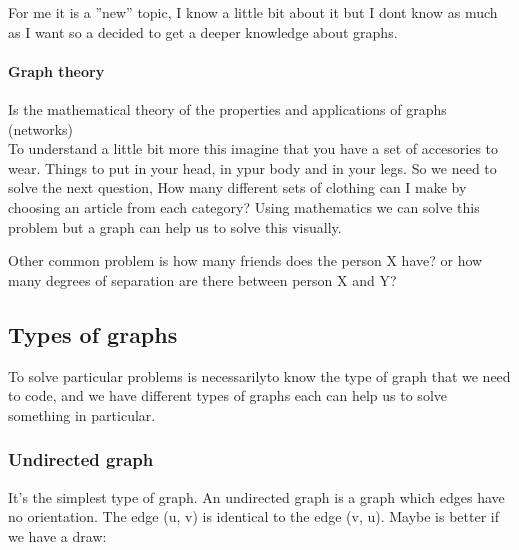 For me it is a ''new'' topic, I know a little bit about it but I dont know as much as I want so a decided to get a deeper knowledge about graphs.

\paragraph{Graph theory}
Is the mathematical theory of the properties and applications of graphs (networks)\\

To understand a little bit more this imagine that you have a set of accesories to wear. Things to put in your head, in ypur body and in your legs. So we need to solve the next question, How many different sets of clothing can I make by choosing an article from each category? Using mathematics we can solve this problem but a graph can help us to solve this visually.

Other common problem is how many friends does the person X have? or how many degrees of separation are there between person X and Y?

\subsection{Types of graphs}

To solve particular problems is necessarilyto know the type of graph that we need to code, and we have different types of graphs each can help us to solve something in particular.

\subsubsection{Undirected graph}
It's the simplest type of graph. An undirected graph is a graph which edges have no orientation. The edge (u, v) is identical to the edge (v, u). Maybe is better if we have a draw:


